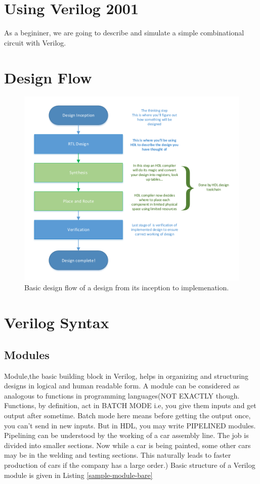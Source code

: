 \documentclass[a4paper,10pt]{article}
\theoremstyle{mytheor}
\begin{document}
\section*{Using Verilog 2001}
As a begininer, we are going to describe and simulate a simple combinational circuit with Verilog.

\section*{Design Flow}  

\begin{figure}[h] \centering 
  \includegraphics[width=\linewidth]{./resources/hdl_design_flow.pdf}
  \caption{Basic design flow of a design from its inception to implemenation.}
  \label{Fig:bst_sample_names}
\end{figure} 

\section*{Verilog Syntax}
\subsection*{Modules}
Module,the basic building block in Verilog, helps in organizing and structuring designs in logical and human readable form. A module can be considered as analogous to functions in programming languages(NOT EXACTLY though. Functions, by definition, act in BATCH MODE i.e, you give them inputs and get output after sometime. Batch mode here means before getting the output once, you can't send in new inputs. But in HDL, you may write PIPELINED modules. Pipelining can be understood by the working of a car assembly line. The job is divided into smaller sections. Now while a car is being painted, some other cars may be in the welding and testing sections. This naturally leads to faster production of cars if the company has a large order.) Basic structure of a Verilog module is given in Listing \ref{sample-module-bare} 
\end{document}
